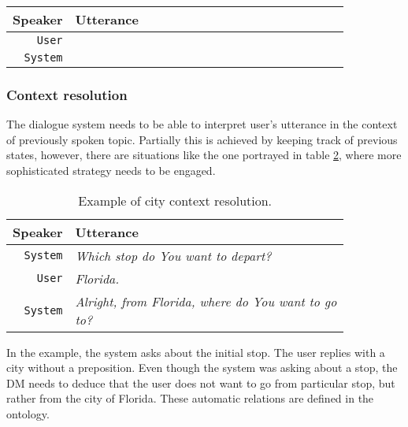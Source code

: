 \begin{table}[h]
\centering
\begin{tabular}{ | r | p{0.85\linewidth} | } \hline
	Speaker & Utterance \\ \hline
	\texttt{User} & \textit{} \\ \hline
	\texttt{System} & \textit{} \\ \hline
\end{tabular}
\caption[]{}
\label{table:negation}
\end{table}

\subsubsection{Context resolution}

The dialogue system needs to be able to interpret user's utterance in the context of previously spoken topic.
Partially this is achieved by keeping track of previous states, however, there are situations like the one portrayed in table \ref{table:cr}, where more sophisticated strategy needs to be engaged.

\begin{table}[h]
\centering
\begin{tabular}{ | r | p{0.85\linewidth} | } \hline
	Speaker & Utterance \\ \hline
	\texttt{System} & \textit{Which stop do You want to depart?} \\ \hline
	\texttt{User} & \textit{Florida.} \\ \hline
	\texttt{System} & \textit{Alright, from Florida, where do You want to go to?} \\ \hline
\end{tabular}
\caption[Context resolution]{Example of city context resolution.}
\label{table:cr}
\end{table}

In the example, the system asks about the initial stop.
The user replies with a city without a preposition.
Even though the system was asking about a stop, the DM needs to deduce that the user does not want to go from particular stop, but rather from the city of Florida.
These automatic relations are defined in the ontology.



